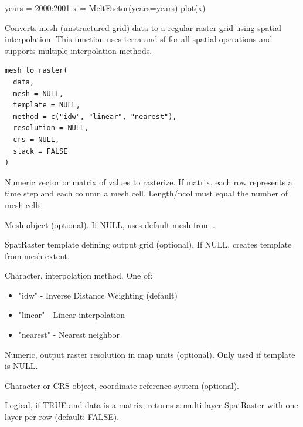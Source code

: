 \documentclass[a4paper]{book}
\begin{document}
%
\begin{Examples}
\begin{ExampleCode}
years = 2000:2001
x = MeltFactor(years=years)
plot(x)
\end{ExampleCode}
\end{Examples}
%
\begin{Description}\relax
Converts mesh (unstructured grid) data to a regular raster grid using
spatial interpolation. This function uses terra and sf for all spatial
operations and supports multiple interpolation methods.
\end{Description}
%
\begin{Usage}
\begin{verbatim}
mesh_to_raster(
  data,
  mesh = NULL,
  template = NULL,
  method = c("idw", "linear", "nearest"),
  resolution = NULL,
  crs = NULL,
  stack = FALSE
)
\end{verbatim}
\end{Usage}
%
\begin{Arguments}
\begin{ldescription}
\item[\code{data}] Numeric vector or matrix of values to rasterize.
If matrix, each row represents a time step and each column a mesh cell.
Length/ncol must equal the number of mesh cells.

\item[\code{mesh}] Mesh object (optional). If NULL, uses default mesh from
.

\item[\code{template}] SpatRaster template defining output grid (optional).
If NULL, creates template from mesh extent.

\item[\code{method}] Character, interpolation method. One of:
\begin{itemize}

\item{} "idw" - Inverse Distance Weighting (default)
\item{} "linear" - Linear interpolation
\item{} "nearest" - Nearest neighbor

\end{itemize}


\item[\code{resolution}] Numeric, output raster resolution in map units (optional).
Only used if template is NULL.

\item[\code{crs}] Character or CRS object, coordinate reference system (optional).

\item[\code{stack}] Logical, if TRUE and data is a matrix, returns a multi-layer
SpatRaster with one layer per row (default: FALSE).
\end{ldescription}
\end{Arguments}
\end{document}
